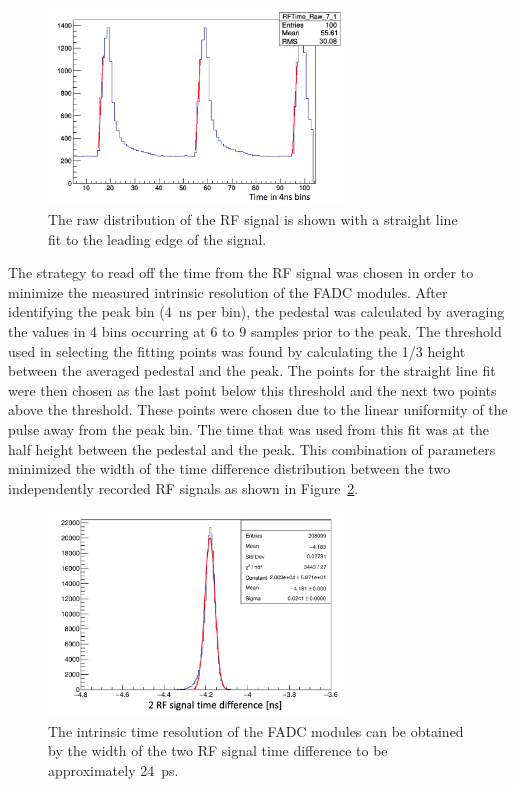 \begin{figure}[htb]
  \centering
      \includegraphics[width=0.7\textwidth]{pics/performance/rfFits.png}
  \caption[Fitted, raw waveform of the RF signal in HPS]{The raw distribution of the RF signal is shown with a straight line fit to the leading edge of the signal.}
  \label{Figure:rfFits}
\end{figure}

The strategy to read off the time from the RF signal was chosen in order to minimize the measured intrinsic resolution of the FADC modules. After identifying the peak bin (4~ns per bin), the pedestal was calculated by averaging the values in 4 bins occurring at 6 to 9 samples prior to the peak. The threshold used in selecting the fitting points was found by calculating the 1/3 height between the averaged pedestal and the peak. The points for the straight line fit were then chosen as the last point below this threshold and the next two points above the threshold. These points were chosen due to the linear uniformity of the pulse away from the
peak bin. The time that was used from this fit was at the half height between the pedestal and the peak. This combination of parameters minimized the width of the time difference distribution between the two independently recorded RF signals as shown in Figure~\ref{Figure:intrTres}. 

\begin{figure}[htb]
  \centering
      \includegraphics[width=0.7\textwidth]{pics/performance/rfRes.png}
  \caption[FADC intrinsic time resolution]{The intrinsic time resolution of the FADC modules can be obtained by the width of the two RF signal time difference to be approximately 24~ps.}
  \label{Figure:intrTres}
\end{figure}


